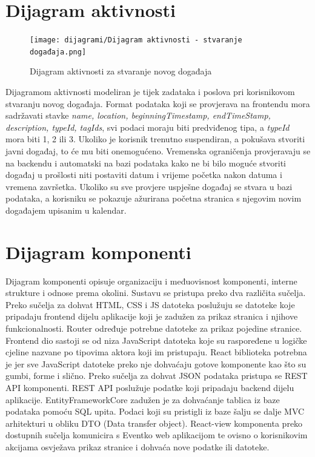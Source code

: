 				\eject 
		
			\section{Dijagram aktivnosti}
			
				\begin{figure}[H]
					\texttt{[image: dijagrami/Dijagram aktivnosti - stvaranje događaja.png]}
					\caption{Dijagram aktivnosti za stvaranje novog događaja}
				\end{figure}
			
				\indent Dijagramom aktivnosti modeliran je tijek zadataka i poslova pri korisnikovom stvaranju novog događaja. Format podataka koji se provjerava na frontendu mora sadržavati stavke \textit{name, location, beginningTimestamp, endTimeStamp, description, typeId, tagIds}, svi podaci moraju biti predviđenog tipa, a \textit{typeId} mora biti 1, 2 ili 3. Ukoliko je korisnik trenutno suspendiran, a pokušava stvoriti javni događaj, to će mu biti onemogućeno. Vremenska ograničenja provjeravaju se na backendu i automatski na bazi podataka kako ne bi bilo moguće stvoriti događaj u prošlosti niti postaviti datum i vrijeme početka nakon datuma i vremena završetka. Ukoliko su sve provjere uspješne događaj se stvara u bazi podataka, a korisniku se pokazuje ažurirana početna stranica s njegovim novim događajem upisanim u kalendar.
			
				\eject
				
			\section{Dijagram komponenti}
		
				\indent Dijagram komponenti opisuje organizaciju i međuovisnost komponenti, interne strukture i odnose prema okolini. Sustavu se pristupa preko dva različita sučelja. Preko sučelja za dohvat HTML, CSS i JS datoteka poslužuju se datoteke koje pripadaju frontend dijelu aplikacije koji je zadužen za prikaz stranica i njihove funkcionalnosti. Router određuje potrebne datoteke za prikaz pojedine stranice. Frontend dio sastoji se od niza JavaScript datoteka koje su raspoređene u logičke cjeline nazvane po tipovima aktora koji im pristupaju. React biblioteka potrebna je jer sve JavaScript datoteke preko nje dohvaćaju gotove komponente kao što su gumbi, forme i slično. Preko sučelja za dohvat JSON podataka pristupa se REST API komponenti. REST API poslužuje podatke koji pripadaju backend dijelu aplikacije. EntityFrameworkCore zadužen je za dohvaćanje tablica iz baze podataka pomoću SQL upita. Podaci koji su pristigli iz baze šalju se dalje MVC arhitekturi u obliku DTO (Data transfer object). React-view komponenta preko dostupnih sučelja komunicira s Eventko web aplikacijom te ovisno o korisnikovim akcijama osvježava prikaz stranice i dohvaća nove podatke ili datoteke.

